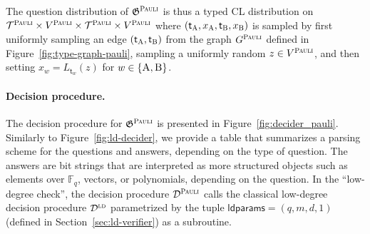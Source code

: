 \documentclass[11pt]{article}
\theoremstyle{definition}
\newcommand{\F}{\ensuremath{\mathbb{F}}}
\newcommand{\ld}{\textsc{ld}}
\newcommand{\game}{\mathfrak{G}}
\newcommand{\decider}{\mathcal{D}}
\newcommand{\type}{\mathcal{T}}
\newcommand{\gamestyle}[1]{\ensuremath{\textsc{#1}}\xspace}
\newcommand{\pauli}{\gamestyle{Pauli}}
\newcommand{\labelstyle}[1]{\ensuremath{\textsc{#1}}\xspace}
\newcommand{\tvarstyle}[1]{\mathsf{#1}}
\newcommand{\tvar}{\ensuremath{\tvarstyle{t}}}
\newcommand{\alice}{\labelstyle{A}}
\newcommand{\bob}{\labelstyle{B}}
\newcommand{\AB}{\{\alice, \bob\}}
\newcommand{\ldparams}{\mathsf{ldparams}}
\begin{document}
The question distribution of $\game^\pauli$ is thus a typed CL distribution on
$\type^\pauli \times V^\pauli \times \type^\pauli \times V^\pauli$ where
$(\tvar_\alice,x_\alice,\tvar_\bob,x_\bob)$ is sampled by first uniformly
sampling an edge $(\tvar_\alice,\tvar_\bob)$ from the graph $G^\pauli$ defined
in Figure~\ref{fig:type-graph-pauli}, sampling a uniformly random $z \in
V^\pauli$, and then setting $x_w = L_{\tvar_w}(z)$ for $w \in \AB$.





\paragraph{Decision procedure.}
The decision procedure for $\game^\pauli$ is presented in
Figure~\ref{fig:decider_pauli}.
Similarly to Figure~\ref{fig:ld-decider}, we provide a table that summarizes a
parsing scheme for the questions and answers, depending on the type of question.
The answers are bit strings that are interpreted as more structured objects such
as elements over $\F_q$, vectors, or polynomials, depending on the question.
In the ``low-degree check'', the decision procedure $\decider^\pauli$ calls the
classical low-degree decision procedure $\decider^\ld$ parametrized by the tuple
$\ldparams = (q,m,d,1)$ (defined in Section~\ref{sec:ld-verifier}) as a
subroutine.
\end{document}
